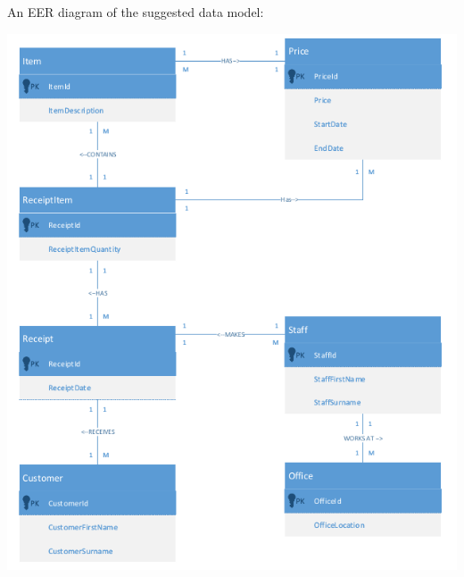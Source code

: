 \documentclass{article}
\begin{document}
    \newpage
    An EER diagram of the suggested data model:
    \begin{center}
        \includegraphics[width=\textwidth-40pt,keepaspectratio]{Images/EER_diagram.png}
    \end{center}

    \newpage
\end{document}
